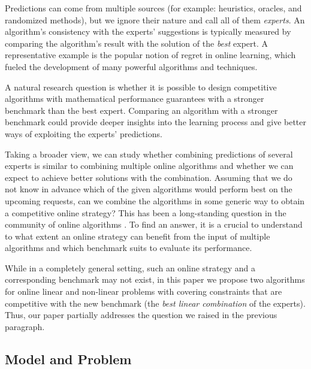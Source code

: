 Predictions can come from multiple sources (for example: heuristics, oracles, and randomized methods), but we ignore their nature and call all of them \emph{experts}.  An algorithm's consistency with the experts' suggestions is typically measured by comparing the algorithm's result with the solution of the \emph{best} expert. A representative example is the popular notion of regret in online learning, which fueled the development of many powerful algorithms and techniques.

A natural research question is whether it is possible to design competitive algorithms with mathematical performance guarantees with a stronger benchmark than the best expert. Comparing an algorithm with a stronger benchmark could provide deeper insights into the learning process and give better ways of exploiting the experts' predictions.

Taking a broader view, we can study whether combining predictions of several experts is similar to combining multiple online algorithms and whether we can expect to achieve better solutions with the combination. Assuming that we do not know in advance which of the given algorithms would perform best on the upcoming requests, can we combine the algorithms in some generic way to obtain a competitive online strategy? This has been a long-standing question in the community of online algorithms \cite{AzarBroder93:On-line-Choice,BlumBurch00:On-line-Learning}. To find an answer, it is a crucial to understand to what extent an online strategy can benefit from the input of multiple algorithms and which benchmark suits to evaluate its performance.

While in a completely general setting, such an online strategy and a corresponding benchmark may not exist, in this paper we propose
two algorithms for online linear and non-linear problems with covering constraints that are competitive with the new benchmark (the \emph{best linear combination} of the experts). Thus, our paper partially addresses the question we raised in the previous paragraph.

\subsection{Model and Problem}

